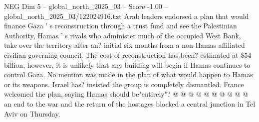 \begin{textsample}{NEG Dim 5 – global\_north\_2025\_03 – Score -1.00 – global\_north\_2025\_03/122024916.txt}
Arab leaders endorsed a plan that would finance Gaza ' s reconstruction through a trust fund and see the Palestinian Authority, Hamas ' s rivals who administer much of the occupied West Bank, take over the territory after an? initial six months from a non-Hamas affiliated civilian governing council.
The cost of reconstruction has been? estimated at \$54 billion, however, it is unlikely that any building will begin if Hamas continues to control Gaza.
No mention was made in the plan of what would happen to Hamas or its weapons.
Israel has? insisted the group is completely dismantled.
France welcomed the plan, saying Hamas should be"entirely"? @ @ @ @ @ @ @ @ @ @ an end to the war and the return of the hostages blocked a central junction in Tel Aviv on Thursday.

\end{textsample}
